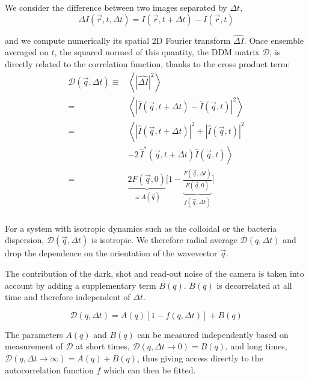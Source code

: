 \documentclass[%
 aip,
 jmp,%
 amsmath,amssymb,
reprint,%
]{revtex4-1}
\newcommand{\tg}[1]{{\color{magenta}#1}} %
\begin{document}
 We consider the difference between two images separated by $\Delta t$,
\begin{equation}
\Delta I(\vec{r},t, \Delta t) = I(\vec{r}, t+\Delta t) - I(\vec{r}, t)
\label{eq:DI}
\end{equation}

and we compute numerically its spatial 2D Fourier transform $\widehat{\Delta I}$. Once ensemble averaged on $t$, the squared normed of this quantity, the DDM matrix $\mathcal{D}$, is directly related to the correlation function, thanks to the cross product term:
\begin{equation}
\begin{align}
\mathcal{D}(\vec{q},\Delta t) \equiv& \left\langle \left|\widehat{\Delta I}\right|^2 \right\rangle\\
 =& \left\langle \left|\widehat{I}(\vec{q},t+\Delta t) - \widehat{I}(\vec{q},t)\right|^2 \right\rangle \\
=& \left\langle \left|\widehat{I}(\vec{q},t+ \Delta t)\right|^2 + \left|\widehat{I}(\vec{q},t)\right|^2\right. \\
&\left.- 2 \, \widehat{I}^*(\vec{q},t+\Delta t) \widehat{I}(\vec{q},t) \right\rangle\\
=& \underbrace{2F(\vec{q}, 0)}_{\equiv A(\vec{q})} \bigg[ 1-\underbrace{\frac{F(\vec{q}, \Delta t)}{F(\vec{q}, 0)}}_{f(\vec{q}, \Delta t)} \bigg]\\
\end{align}
\label{eq:DDM}
\end{equation}

\tg{For a system with isotropic dynamics such as the colloidal or the bacteria dispersion,  $\mathcal{D}(\vec{q},\Delta t)$  is isotropic. We therefore radial average $\mathcal{D}(q,\Delta t)$ and drop the dependence on the orientation of the wavevector $\vec{q}$.}

The contribution of the \tg{dark, shot and read-out noise\cite{Mignard2015,Joubert2011}} of the camera is taken into account by adding a supplementary term $B(q)$. $B(q)$ is decorrelated  at all time and therefore independent of $\Delta t$.

\begin{equation}
\mathcal{D}(q,\Delta t) = A(q)\left[1-f(q, \Delta t)\right] + B(q)
\label{eq:D2f}
\end{equation}

The parameters $A(q)$ and $B(q)$ can be measured independently based on measurement of $\mathcal{D}$ at short times, $\mathcal{D}(q,\Delta t\rightarrow 0) = B(q)$, and long times, $\mathcal{D}(q,\Delta t\rightarrow \infty) = A(q)+B(q)$, thus giving access directly to the autocorrelation function $f$ which can then be fitted.
\end{document}
